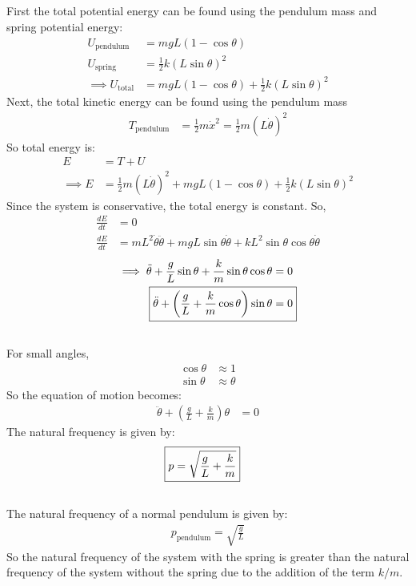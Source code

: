 \subsection{}
First the total potential energy can be found using the pendulum mass and spring potential energy:
\begin{align*}
    U_{\text{pendulum}} &= m g L (1 - \cos \theta) \\
    U_{\text{spring}} &= \frac{1}{2} k (L \sin \theta)^2  \\
    \implies U_{\text{total}} &= m g L (1 - \cos \theta) + \frac{1}{2} k (L \sin \theta)^2
\end{align*}
Next, the total kinetic energy can be found using the pendulum mass 
\begin{align*}
    T_{\text{pendulum}} &= \frac{1}{2} m \dot{x}^2  = \frac{1}{2} m (L \dot{\theta})^2 
\end{align*}
So total energy is:
\begin{align*}
    E &= T + U \\
    \implies E &= \frac{1}{2} m (L \dot{\theta})^2 + m g L (1 - \cos \theta) + \frac{1}{2} k (L \sin \theta)^2
\end{align*}
Since the system is conservative, the total energy is constant. So,
\begin{align*}
    \frac{dE}{dt} &= 0 \\
    \frac{dE}{dt} &= m L^2 \dot{\theta} \ddot{\theta} + m g L \sin \theta \dot{\theta} + k L^2 \sin \theta \cos \theta \dot{\theta} 
\end{align*}
\begin{align*}
    \implies \ddot{\theta} + \frac{g}{L} \sin \theta + \frac{k}{m} \sin \theta \cos \theta &= 0 \\
    \Aboxed{\ddot{\theta} + \left(\frac{g}{L} + \frac{k}{m} \cos \theta\right) \sin \theta &= 0}
\end{align*}

\subsection{}
For small angles,
\begin{align*}
    \cos \theta &\approx 1 \\
    \sin \theta &\approx \theta
\end{align*}
So the equation of motion becomes:
\begin{align*}
    \ddot{\theta} + \left(\frac{g}{L} + \frac{k}{m}\right) \theta &= 0
\end{align*}
The natural frequency is given by:
\begin{align*}
    \Aboxed{p = \sqrt{\frac{g}{L} + \frac{k}{m}}}
\end{align*}

\subsection{}
The natural frequency of a normal pendulum is given by:
\begin{align*}
    p_{\text{pendulum}} = \sqrt{\frac{g}{L}}
\end{align*}
So the natural frequency of the system with the spring is greater than the natural frequency of the
system without the spring due to the addition of the term $k/m$.